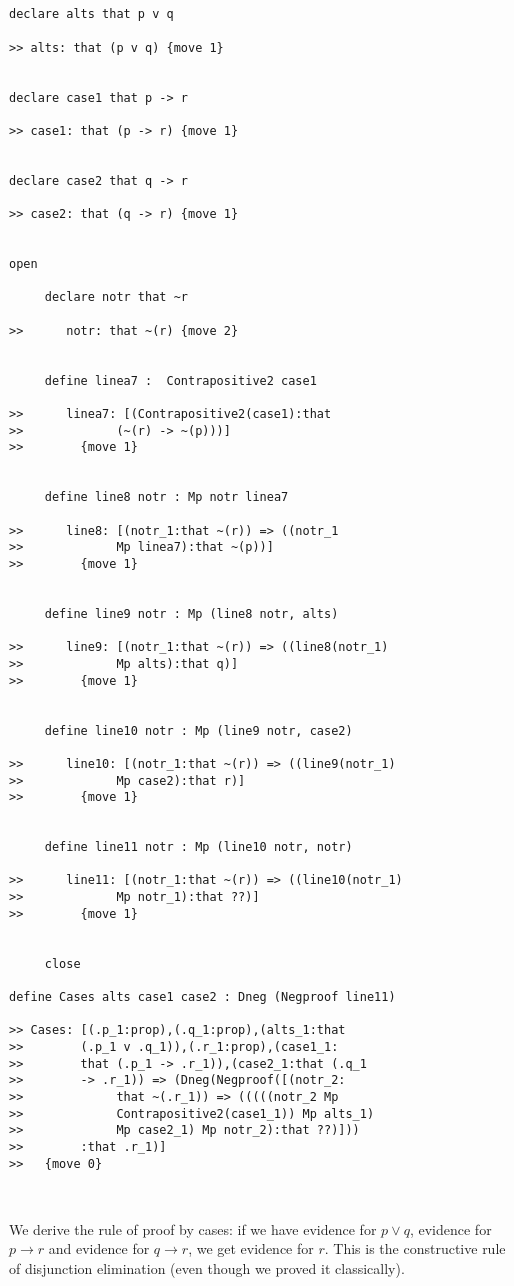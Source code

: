 \documentclass[12pt]{article}
\begin{document}
\begin{verbatim}


declare alts that p v q

>> alts: that (p v q) {move 1}


declare case1 that p -> r

>> case1: that (p -> r) {move 1}


declare case2 that q -> r

>> case2: that (q -> r) {move 1}


open

     declare notr that ~r

>>      notr: that ~(r) {move 2}


     define linea7 :  Contrapositive2 case1

>>      linea7: [(Contrapositive2(case1):that 
>>             (~(r) -> ~(p)))]
>>        {move 1}


     define line8 notr : Mp notr linea7

>>      line8: [(notr_1:that ~(r)) => ((notr_1 
>>             Mp linea7):that ~(p))]
>>        {move 1}


     define line9 notr : Mp (line8 notr, alts)

>>      line9: [(notr_1:that ~(r)) => ((line8(notr_1) 
>>             Mp alts):that q)]
>>        {move 1}


     define line10 notr : Mp (line9 notr, case2)

>>      line10: [(notr_1:that ~(r)) => ((line9(notr_1) 
>>             Mp case2):that r)]
>>        {move 1}


     define line11 notr : Mp (line10 notr, notr)

>>      line11: [(notr_1:that ~(r)) => ((line10(notr_1) 
>>             Mp notr_1):that ??)]
>>        {move 1}


     close

define Cases alts case1 case2 : Dneg (Negproof line11)

>> Cases: [(.p_1:prop),(.q_1:prop),(alts_1:that 
>>        (.p_1 v .q_1)),(.r_1:prop),(case1_1:
>>        that (.p_1 -> .r_1)),(case2_1:that (.q_1 
>>        -> .r_1)) => (Dneg(Negproof([(notr_2:
>>             that ~(.r_1)) => (((((notr_2 Mp 
>>             Contrapositive2(case1_1)) Mp alts_1) 
>>             Mp case2_1) Mp notr_2):that ??)]))
>>        :that .r_1)]
>>   {move 0}



\end{verbatim}

We derive the rule of proof by cases:  if we have evidence for $p \vee q$, evidence for $p \rightarrow r$ and evidence for
$q \rightarrow r$, we get evidence for $r$.  This is the constructive rule of disjunction elimination (even though we proved it classically).
\end{document}
